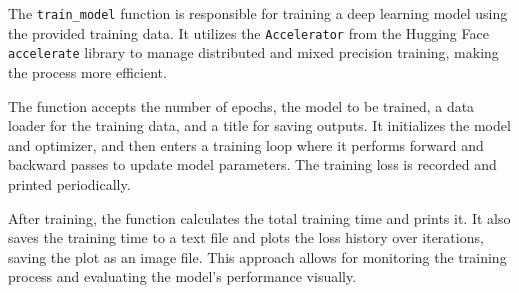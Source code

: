 The \texttt{train\_model} function is responsible for training a deep learning model using the provided training data. It utilizes the \texttt{Accelerator} from the Hugging Face \texttt{accelerate} library to manage distributed and mixed precision training, making the process more efficient.

The function accepts the number of epochs, the model to be trained, a data loader for the training data, and a title for saving outputs. It initializes the model and optimizer, and then enters a training loop where it performs forward and backward passes to update model parameters. The training loss is recorded and printed periodically.

After training, the function calculates the total training time and prints it. It also saves the training time to a text file and plots the loss history over iterations, saving the plot as an image file. This approach allows for monitoring the training process and evaluating the model's performance visually.

